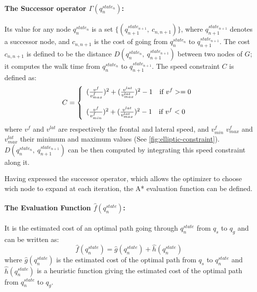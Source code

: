 \paragraph{The Successor operator $\Gamma(q_n^{state_n})$:}
Its value for any node $q_n^{state_n}$ is a set
$\{(q_{n+1}^{state_{n+1}},~c_{n,n+1})\}$, where
$q_{n+1}^{state_{n+1}}$ denotes a successor node, and $c_{n,n+1}$ is
the cost of going from $q_n^{state_n}$ to $q_{n+1}^{state_{n+1}}$. The
cost $c_{n,n+1}$ is defined to be the distance
$D(q_n^{state_n},~q_{n+1}^{state_{n+1}})$ between two nodes of $G$; it
computes the walk time from $q_n^{state_n}$ to
$q_{n+1}^{state_{n+1}}$. The speed constraint $C$ is defined as:
\begin{equation}
C = \left\{
\begin{array}{l l l}
  (\frac{v^{f}}{v_{max}^{f}})^2 +
  (\frac{v^{lat}}{v_{max}^{lat}})^2 - 1
  \quad \text{if } v^f >= 0 \\

  \\

  (\frac{v^{f}}{v_{min}^{f}})^2 +
  (\frac{v^{lat}}{v_{max}^{lat}})^2 - 1
  \quad \text{if } v^f < 0
\end{array} \right.
\end{equation}
where $v^{f}$ and $v^{lat}$ are respectively the frontal and lateral
speed, and $v_{min}^f$ $v_{max}^{f}$ and $v_{max}^{lat}$ their minimum
and maximum values (See
\autoref{fig:elliptic-constraint}).$D(q_n^{state_n},~q_{n+1}^{state_{n+1}})$
can be then computed by integrating this speed constraint along it.

Having expressed the successor operator, which allows the optimizer to
choose wich node to expand at each iteration, the A* evaluation
function can be defined.

\paragraph{The Evaluation Function $\hat{f}(q_n^{state})$:}
It is the estimated cost of an optimal path going through
$q_n^{state}$ from $q_s$ to $q_g$ and can be written as:
\begin{equation}
  \hat{f}(q_n^{state}) = \hat{g}(q_n^{state}) + \hat{h}(q_n^{state})
\end{equation}
where $\hat{g}(q_n^{state})$ is the estimated cost of the optimal path
from $q_s$ to $q_n^{state}$ and $\hat{h}(q_n^{state})$ is a heuristic
function giving the estimated cost of the optimal path from
$q_n^{state}$ to $q_g$.

